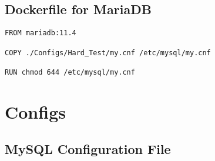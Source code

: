 \subsection{Dockerfile for MariaDB}
\label{sec:dockerfile-mariadb}

\begin{lstlisting}[caption={Dockerfile for MariaDB}, label={lst:dockerfile-mariadb}]
FROM mariadb:11.4

COPY ./Configs/Hard_Test/my.cnf /etc/mysql/my.cnf

RUN chmod 644 /etc/mysql/my.cnf
\end{lstlisting}

\pagebreak

\section{Configs}

\subsection{MySQL Configuration File}
\label{sec:mysql-config}


